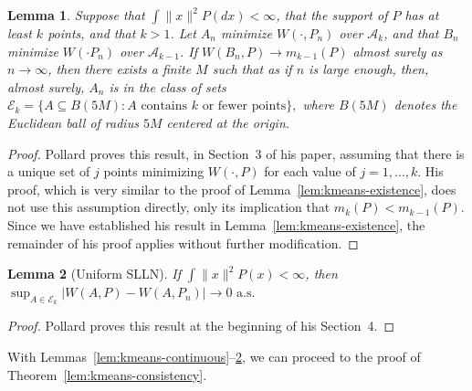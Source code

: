 \documentclass[11pt]{article}
\newtheorem{lemma}{Lemma}
\newcommand{\sA}{\mathcal{A}}
\newcommand{\sE}{\mathcal{E}}
\begin{document}
\begin{lemma}
\label{lem:pollard-compact}
Suppose that $\int \|x\|^2 P(dx) < \infty$, that the support of $P$ has at
least $k$ points, and that $k > 1$.  Let $A_n$ minimize $W(\cdot, P_n)$ over
$\sA_k$, and that $B_n$ minimize $W(\cdot P_n)$ over $\sA_{k-1}$.  If $W(B_n,
P) \to m_{k-1}(P)$ almost surely as $n \to \infty$, then there exists a finite
$M$ such that as if $n$ is large enough, then, almost surely, $A_n$ is in the
class of sets
\(
  \sE_k = \{ A \subseteq B(5M) : \text{$A$ contains $k$ or fewer points} \},
\)
where $B(5M)$ denotes the Euclidean ball of radius $5M$ centered at the
origin.
\end{lemma}

\begin{proof}
Pollard proves this result, in Section~3 of his paper,  assuming that there is
a unique set of $j$ points minimizing $W(\cdot, P)$ for each value of $j = 1,
\dotsc, k$.  His proof, which is very similar to the proof of
Lemma~\ref{lem:kmeans-existence}, does not use this assumption directly, only
its implication that $m_{k}(P) < m_{k-1}(P)$.  Since we have established his
result in Lemma~\ref{lem:kmeans-existence}, the remainder of his proof applies
without further modification.
\end{proof}


\begin{lemma}[Uniform SLLN]\label{lem:kmeans-uniform-slln}
If $\int \|x\|^2 P(x) < \infty$, then
\(
  \sup_{A \in \sE_k} |W(A, P) - W(A,P_n)| \to 0\text{ a.s.}
\)
\end{lemma}
\begin{proof}
Pollard proves this result at the beginning of his Section~4.
\end{proof}

With Lemmas~\ref{lem:kmeans-continuous}--\ref{lem:kmeans-uniform-slln}, we can
proceed to the proof of Theorem~\ref{lem:kmeans-consistency}.
\end{document}
